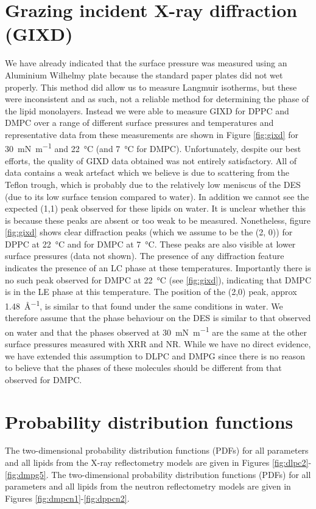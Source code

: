 \documentclass[11pt,a4paper]{paper}
\begin{document}
\section{Grazing incident X-ray diffraction (GIXD)}
\label{sec:gixd}
We have already indicated that the surface pressure was measured using an Aluminium Wilhelmy plate because the standard paper plates did not wet properly. This method did allow us to measure Langmuir isotherms, but these were inconsistent and as such, not a reliable method for determining the phase of the lipid monolayers.
Instead we were able to measure GIXD for DPPC and DMPC over a range of different surface pressures and temperatures and representative data from these measurements are shown in Figure \ref{fig:gixd} for \SI{30}{\milli\newton\per\meter} and \SI{22}{\celsius} (and \SI{7}{\celsius} for DMPC).  Unfortunately, despite our best efforts, the quality of GIXD data obtained was not entirely satisfactory. All of data contains a weak artefact which we believe is due to scattering from the Teflon trough, which is probably due to the relatively low meniscus of the DES (due to its low surface tension compared to water). In addition we cannot see the expected (1,1) peak observed for these lipids on water. It is unclear whether this is because these peaks are absent or too weak to be measured. Nonetheless, figure \ref{fig:gixd} shows clear diffraction peaks (which we assume to be the (2, 0)) for DPPC at \SI{22}{\celsius} and for DMPC at \SI{7}{\celsius}. These peaks are also visible at lower surface pressures (data not shown). The presence of any diffraction feature indicates the presence of an LC phase at these temperatures. Importantly there is no such peak observed for DMPC at \SI{22}{\celsius} (see \ref{fig:gixd}), indicating that DMPC is in the LE phase at this temperature. The position of the (2,0) peak, approx \SI{1.48}{\AA^{-1}}, is similar to that found under the same conditions in water.\cite{Watkins2009}
We therefore assume that the phase behaviour on the DES is similar to that observed on water and that the phases observed at \SI{30}{\milli\newton\per\meter} are the same at the other surface pressures measured with XRR and NR. While we have no direct evidence, we have extended this assumption to DLPC and DMPG since there is no reason to believe that the phases of these molecules should be different from that observed for DMPC.

\section{Probability distribution functions}
The two-dimensional probability distribution functions (PDFs) for all parameters and all lipids from the X-ray reflectometry models are given in Figures \ref{fig:dlpc2}-\ref{fig:dmpg5}. The two-dimensional probability distribution functions (PDFs) for all parameters and all lipids from the neutron reflectometry models are given in Figures \ref{fig:dmpcn1}-\ref{fig:dppcn2}.
\end{document}
